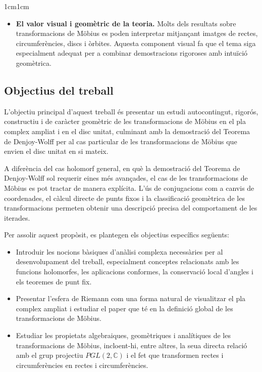 \begin{adjustwidth}{1cm}{1cm}
\begin{itemize}
\item \textbf{El valor visual i geomètric de la teoria.} Molts dels resultats sobre transformacions de Möbius es poden interpretar mitjançant imatges de rectes, circumferències, discs i òrbites. Aquesta component visual fa que el tema siga especialment adequat per a combinar demostracions rigoroses amb intuïció geomètrica.

\end{itemize}

\subsection{Objectius del treball}

L'objectiu principal d'aquest treball és presentar un estudi autocontingut, rigorós, constructiu i de caràcter geomètric de les transformacions de Möbius en el pla complex ampliat i en el disc unitat, culminant amb la demostració del Teorema de Denjoy-Wolff per al cas particular de les transformacions de Möbius que envien el disc unitat en si mateix.

A diferència del cas holomorf general, en què la demostració del Teorema de Denjoy-Wolff sol requerir eines més avançades, el cas de les transformacions de Möbius es pot tractar de manera explícita. L'ús de conjugacions com a canvis de coordenades, el càlcul directe de punts fixos i la classificació geomètrica de les transformacions permeten obtenir una descripció precisa del comportament de les iterades.

Per assolir aquest propòsit, es plantegen els objectius específics següents:

\begin{itemize}
\item Introduir les nocions bàsiques d'anàlisi complexa necessàries per al desenvolupament del treball, especialment conceptes relacionats amb les funcions holomorfes, les aplicacions conformes, la conservació local d'angles i els teoremes de punt fix.

\item Presentar l'esfera de Riemann com una forma natural de visualitzar el pla complex ampliat i estudiar el paper que té en la definició global de les transformacions de Möbius.

\item Estudiar les propietats algebraiques, geomètriques i analítiques de les transformacions de Möbius, incloent-hi, entre altres, la seua directa relació amb el grup projectiu $PGL(2,\mathbb{C})$ i el fet que transformen rectes i circumferències en rectes i circumferències.


\end{itemize}
\end{adjustwidth}

